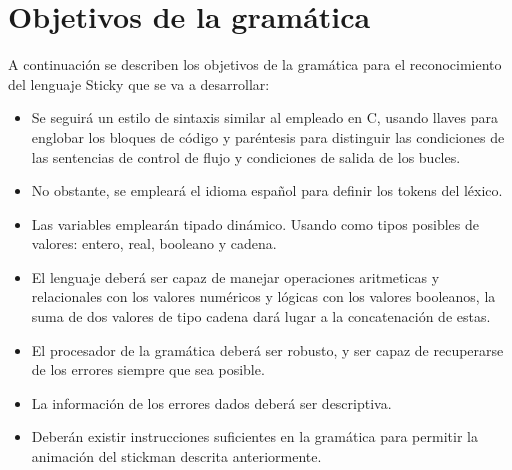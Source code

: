    \section{Objetivos de la gramática}
   A continuación se describen los objetivos de la gramática para el reconocimiento del lenguaje Sticky que se va a desarrollar: 
   \begin{itemize}
     \item Se seguirá un estilo de sintaxis similar al empleado en C, usando llaves para englobar los bloques de código y paréntesis para distinguir las condiciones de las sentencias de control de flujo y condiciones de salida de los bucles.
     \item No obstante, se empleará el idioma español para definir los tokens del léxico.
     \item Las variables emplearán tipado dinámico. Usando como tipos posibles de valores: entero, real, booleano y cadena.
     \item El lenguaje deberá ser capaz de manejar operaciones aritmeticas y relacionales con los valores numéricos y lógicas con los valores booleanos, la suma de dos valores de tipo cadena dará lugar a la concatenación de estas.
     \item El procesador de la gramática deberá ser robusto, y ser capaz de recuperarse de los errores siempre que sea posible.
     \item La información de los errores dados deberá ser descriptiva.
     \item Deberán existir instrucciones suficientes en la gramática para permitir la animación del stickman descrita anteriormente.
   \end{itemize}






















